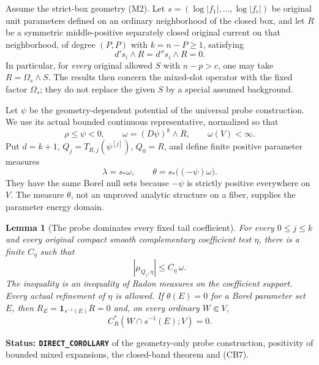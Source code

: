 \documentclass[11pt,a4paper]{article}
\numberwithin{equation}{section}
\newtheorem{lemma}[theorem]{Lemma}
\theoremstyle{definition}
\theoremstyle{remark}
\begin{document}
Assume the strict-box geometry (M2). Let $s=(\log|f_1|,\ldots,
\log|f_c|)$ be original unit parameters defined on an ordinary
neighborhood of the closed box, and let $R$ be a symmetric
middle-positive separately closed original current on that
neighborhood, of degree $(P,P)$ with $k=n-P\geq1$, satisfying
\[
                         d's_i\wedge R=d''s_i\wedge R=0.
 \tag{PD1}
\]
In particular, for \emph{every} original allowed $S$ with
$n-p>c$, one may take $R=\Omega_s\wedge S$. The results then
concern the mixed-slot operator with the fixed factor $\Omega_s$;
they do not replace the given $S$ by a special assumed background.

Let $\psi$ be the geometry-dependent potential of the universal
probe construction. We use its actual bounded continuous
representative, normalized so that
\[
 \rho\leq\psi<0,\qquad
 \omega=(D\psi)^k\wedge R,\qquad \omega(V)<\infty.
 \tag{PD2}
\]
Put $d=k+1$, $Q_j=T_{R,j}(\psi^{[j]})$, $Q_0=R$, and define
finite positive parameter measures
\[
                      \lambda=s_*\omega,\qquad
                      \theta=s_*\bigl((-\psi)\omega\bigr).
 \tag{PD3}
\]
They have the same Borel null sets because $-\psi$ is strictly
positive everywhere on $V$. The measure $\theta$, not an
unproved analytic structure on a fiber, supplies the parameter
energy domain.

\begin{lemma}[The probe dominates every fixed tail coefficient]
\label{lem:r12-parameter-tail-domination}
For every $0\leq j\leq k$ and every original compact smooth
complementary coefficient test $\eta$, there is a finite
$C_\eta$ such that
\[
                         |\mu_{Q_j,\eta}|\leq C_\eta\,\omega.
 \tag{PD4}
\]
The inequality is an inequality of Radon measures on the
coefficient support. Every actual refinement of $\eta$ is
allowed. If $\theta(E)=0$ for a Borel parameter set $E$, then
$R_E=\mathbf1_{s^{-1}(E)}R=0$ and, on every ordinary
$W\Subset V$,
\[
                     C_R^*(W\cap s^{-1}(E);V)=0.
 \tag{PD5}
\]
\end{lemma}

\noindent\textbf{Status: \texttt{DIRECT\_COROLLARY}} of the
geometry-only probe construction, positivity of bounded mixed
expansions, the closed-band theorem and (CB7).
\end{document}
